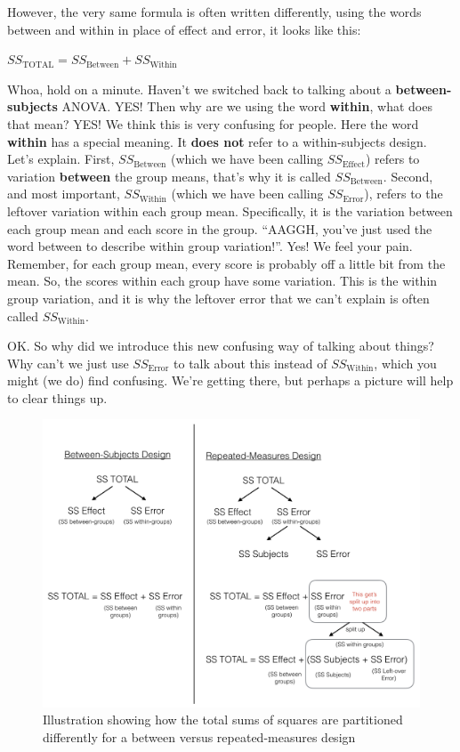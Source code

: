 \documentclass[]{book}
\begin{document}
However, the very same formula is often written differently, using the words between and within in place of effect and error, it looks like this:

\(SS_\text{TOTAL} = SS_\text{Between} + SS_\text{Within}\)

Whoa, hold on a minute. Haven't we switched back to talking about a \textbf{between-subjects} ANOVA. YES! Then why are we using the word \textbf{within}, what does that mean? YES! We think this is very confusing for people. Here the word \textbf{within} has a special meaning. It \textbf{does not} refer to a within-subjects design. Let's explain. First, \(SS_\text{Between}\) (which we have been calling \(SS_\text{Effect}\)) refers to variation \textbf{between} the group means, that's why it is called \(SS_\text{Between}\). Second, and most important, \(SS_\text{Within}\) (which we have been calling \(SS_\text{Error}\)), refers to the leftover variation within each group mean. Specifically, it is the variation between each group mean and each score in the group. ``AAGGH, you've just used the word between to describe within group variation!''. Yes! We feel your pain. Remember, for each group mean, every score is probably off a little bit from the mean. So, the scores within each group have some variation. This is the within group variation, and it is why the leftover error that we can't explain is often called \(SS_\text{Within}\).

OK. So why did we introduce this new confusing way of talking about things? Why can't we just use \(SS_\text{Error}\) to talk about this instead of \(SS_\text{Within}\), which you might (we do) find confusing. We're getting there, but perhaps a picture will help to clear things up.

\begin{figure}
\centering
\includegraphics{figures/SS_ANOVA.png}
\caption{\label{fig:8splitSS}Illustration showing how the total sums of squares are partitioned differently for a between versus repeated-measures design}
\end{figure}
\end{document}
